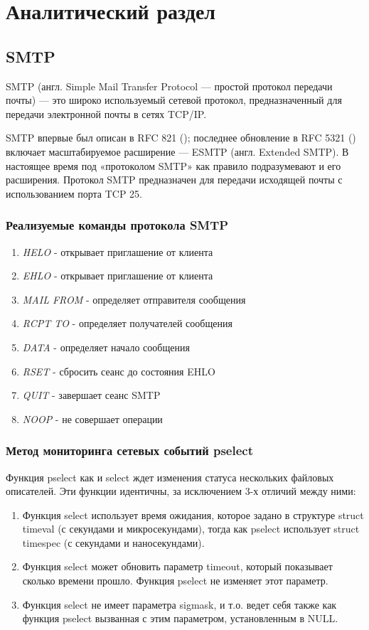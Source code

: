 \documentclass[a4paper,12pt]{report}
\begin{document}
\chapter{Аналитический раздел}

\section{SMTP}
SMTP (англ. Simple Mail Transfer Protocol — простой протокол передачи почты) — это широко используемый сетевой
протокол, предназначенный для передачи электронной почты в сетях TCP/IP.

SMTP впервые был описан в RFC 821 (\cite{rfc821}); последнее обновление в RFC 5321 (\cite{rfc5321}) включает масштабируемое
расширение — ESMTP (англ.  Extended SMTP). В настоящее время под «протоколом SMTP» как правило подразумевают
и его расширения. Протокол SMTP предназначен для передачи исходящей почты с использованием порта TCP 25.

\subsection{Реализуемые команды протокола SMTP}
\begin{enumerate}
	\item \textit{HELO} - открывает приглашение от клиента
    \item \textit{EHLO} - открывает приглашение от клиента
    \item \textit{MAIL FROM} - определяет отправителя сообщения
    \item \textit{RCPT TO} - определяет получателей сообщения
    \item \textit{DATA} - определяет начало сообщения
    \item \textit{RSET} - сбросить сеанс до состояния EHLO
    \item \textit{QUIT} - завершает сеанс SMTP
    \item \textit{NOOP} - не совершает операции

\end{enumerate}


\subsection{Метод мониторинга сетевых событий pselect}
Функция pselect как и select ждет изменения статуса нескольких файловых описателей.
Эти функции идентичны, за исключением 3-х отличий между ними:
\begin{enumerate}
\item Функция select использует время ожидания, которое задано в структуре struct timeval (с секундами и микросекундами), тогда как pselect использует struct timespec (с секундами и наносекундами).
\item Функция select может обновить параметр timeout, который показывает сколько времени прошло. Функция pselect не изменяет этот параметр.
\item Функция select не имеет параметра sigmask, и т.о. ведет себя также как функция pselect вызванная с этим параметром, установленным в NULL.
\end{enumerate}
\end{document}
